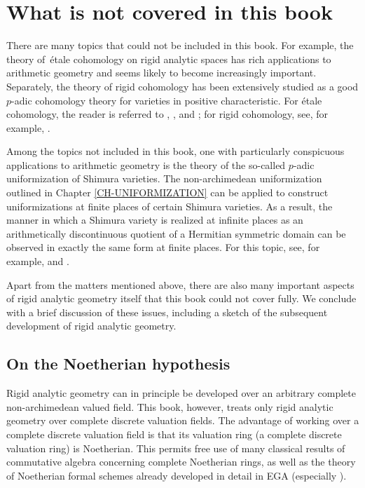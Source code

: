 \documentclass[a4paper,12pt, dvipdfmx]{jsbook}
\theoremstyle{plain}
\theoremstyle{definition}
\begin{document}
\section{What is not covered in this book}\label{sec-further}
There are many topics that could not be included in this book.
For example, the theory of \,\'etale cohomology on rigid analytic spaces has rich applications to arithmetic geometry and seems likely to become increasingly important.
Separately, the theory of rigid cohomology has been extensively studied as a good $p$-adic cohomology theory for varieties in positive characteristic.
For \'etale cohomology, the reader is referred to \cite{deJo2}, \cite{Berk2}, and \cite{Hube3}; for rigid cohomology, see, for example, \cite{Lestum}.

Among the topics not included in this book, one with particularly conspicuous applications to arithmetic geometry is the theory of the so-called $p$-adic uniformization of Shimura varieties.
The non-archimedean uniformization outlined in Chapter \ref{CH-UNIFORMIZATION} can be applied to construct uniformizations at finite places of certain Shimura varieties.
As a result, the manner in which a Shimura variety is realized at infinite places as an arithmetically discontinuous quotient of a Hermitian symmetric domain can be observed in exactly the same form at finite places.
For this topic, see, for example, \cite{RaZi} and \cite{Var}.

Apart from the matters mentioned above, there are also many important aspects of rigid analytic geometry itself that this book could not cover fully.
We conclude with a brief discussion of these issues, including a sketch of the subsequent development of rigid analytic geometry.

\subsection{On the Noetherian hypothesis}\label{sub-Noetherhypothesis}
Rigid analytic geometry can in principle be developed over an arbitrary complete non-archimedean valued field.
This book, however, treats only rigid analytic geometry over complete discrete valuation fields.
The advantage of working over a complete discrete valuation field is that its valuation ring (a complete discrete valuation ring) is Noetherian.
This permits free use of many classical results of commutative algebra concerning complete Noetherian rings, as well as the theory of Noetherian formal schemes already developed in detail in EGA (especially \cite[$\mathbf{III}$]{EGA}).
\end{document}
